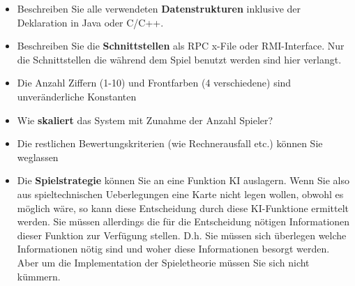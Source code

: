 \begin{itemize}
 \item Beschreiben Sie alle verwendeten \textbf{Datenstrukturen} inklusive der Deklaration in Java oder C/C++.
 \item Beschreiben Sie die \textbf{Schnittstellen} als RPC x-File oder RMI-Interface. Nur die Schnittstellen die während dem Spiel benutzt werden sind hier verlangt.
 \item Die Anzahl Ziffern (1-10) und Frontfarben (4 verschiedene) sind unveränderliche Konstanten
 \item Wie \textbf{skaliert} das System mit Zunahme der Anzahl Spieler?
 \item Die restlichen Bewertungskriterien (wie Rechnerausfall etc.) können Sie weglassen
 \item Die \textbf{Spielstrategie} können Sie an eine Funktion KI auslagern. Wenn Sie also aus spieltechnischen Ueberlegungen eine Karte nicht legen wollen, obwohl es möglich wäre, so kann diese Entscheidung durch diese KI-Funktione ermittelt werden. Sie müssen allerdings die für die Entscheidung nötigen Informationen dieser Funktion zur Verfügung stellen. D.h. Sie müssen sich überlegen welche Informationen nötig sind und woher diese Informationen besorgt werden. Aber um die Implementation der Spieletheorie müssen Sie sich nicht kümmern.
\end{itemize}
	
	
	
